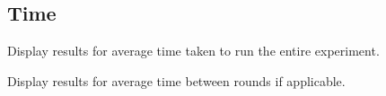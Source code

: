 \subsection{Time}

Display results for average time taken to run the entire experiment.

Display results for average time between rounds if applicable.
